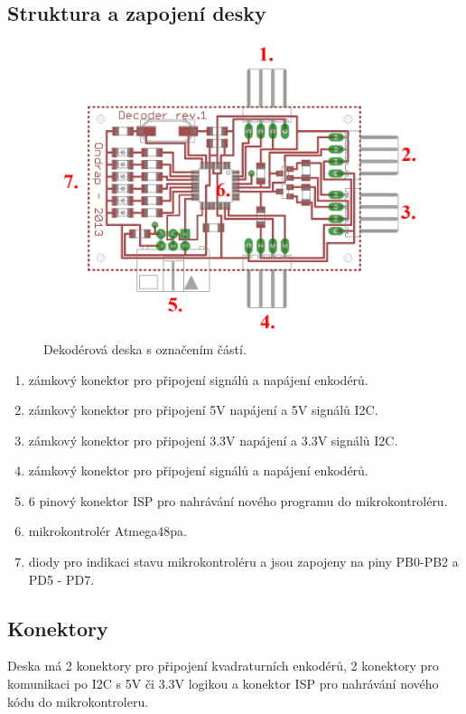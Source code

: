 \documentclass[a4paper,11pt]{article}
\begin{document}
\newpage
\subsection{Struktura a zapojení desky}

\begin{figure}[htbp]
	\centering
		\includegraphics{dekoderyDeskaOznacena.png}
	\caption{Dekodérová deska s označením částí.}
	\label{fig:dekoderyDeska}
\end{figure}


\begin{enumerate}
	\item zámkový konektor pro připojení signálů a napájení enkodérů.
	\item zámkový konektor pro připojení 5V napájení a 5V signálů I2C.
	\item zámkový konektor pro připojení 3.3V napájení a 3.3V signálů I2C.
	\item zámkový konektor pro připojení signálů a napájení enkodérů.
	\item 6 pinový konektor ISP pro nahrávání nového programu do mikrokontroléru.
	\item mikrokontrolér Atmega48pa.
	\item diody pro indikaci stavu mikrokontroléru a jsou zapojeny na piny PB0-PB2 a PD5 - PD7.
\end{enumerate}

\newpage
\subsection{Konektory}
Deska má 2 konektory pro připojení kvadraturních enkodérů, 2 konektory pro komunikaci po I2C s 5V či 3.3V logikou a konektor ISP pro nahrávání nového kódu do mikrokontroleru.
\end{document}
